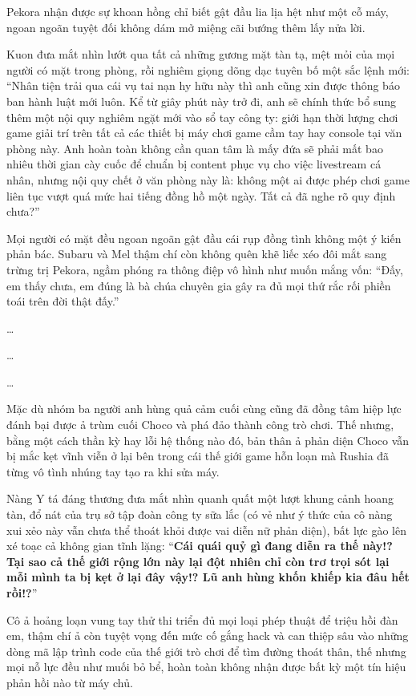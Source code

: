 \documentclass[../main.tex]{subfiles}
\begin{document}
Pekora nhận được sự khoan hồng chỉ biết gật đầu lia lịa hệt như một cỗ máy, ngoan ngoãn tuyệt đối không dám mở miệng cãi bướng thêm lấy nửa lời.

Kuon đưa mắt nhìn lướt qua tất cả những gương mặt tàn tạ, mệt mỏi của mọi người có mặt trong phòng, rồi nghiêm giọng dõng dạc tuyên bố một sắc lệnh mới: ``Nhân tiện trải qua cái vụ tai nạn hy hữu này thì anh cũng xin được thông báo ban hành luật mới luôn. Kể từ giây phút này trở đi, anh sẽ chính thức bổ sung thêm một nội quy nghiêm ngặt mới vào sổ tay công ty: giới hạn thời lượng chơi game giải trí trên tất cả các thiết bị máy chơi game cầm tay hay console tại văn phòng này. Anh hoàn toàn không cần quan tâm là mấy đứa sẽ phải mất bao nhiêu thời gian cày cuốc để chuẩn bị content phục vụ cho việc livestream cá nhân, nhưng nội quy chết ở văn phòng này là: không một ai được phép chơi game liên tục vượt quá mức hai tiếng đồng hồ một ngày. Tất cả đã nghe rõ quy định chưa?''

Mọi người có mặt đều ngoan ngoãn gật đầu cái rụp đồng tình không một ý kiến phản bác. Subaru và Mel thậm chí còn không quên khẽ liếc xéo đôi mắt sang trừng trị Pekora, ngầm phóng ra thông điệp vô hình như muốn mắng vốn: ``Đấy, em thấy chưa, em đúng là bà chúa chuyên gia gây ra đủ mọi thứ rắc rối phiền toái trên đời thật đấy.''

\dots

\dots

\dots

Mặc dù nhóm ba người anh hùng quả cảm cuối cùng cũng đã đồng tâm hiệp lực đánh bại được ả trùm cuối Choco và phá đảo thành công trò chơi. Thế nhưng, bằng một cách thần kỳ hay lỗi hệ thống nào đó, bản thân ả phản diện Choco vẫn bị mắc kẹt vĩnh viễn ở lại bên trong cái thế giới game hỗn loạn mà Rushia đã từng vô tình nhúng tay tạo ra khi sửa máy.

Nàng Y tá đáng thương đưa mắt nhìn quanh quất một lượt khung cảnh hoang tàn, đổ nát của trụ sở tập đoàn công ty sữa lắc (có vẻ như ý thức của cô nàng xui xẻo này vẫn chưa thể thoát khỏi được vai diễn nữ phản diện), bất lực gào lên xé toạc cả không gian tĩnh lặng: ``\textbf{Cái quái quỷ gì đang diễn ra thế này!? Tại sao cả thế giới rộng lớn này lại đột nhiên chỉ còn trơ trọi sót lại mỗi mình ta bị kẹt ở lại đây vậy!? Lũ anh hùng khốn khiếp kia đâu hết rồi!?}''

Cô ả hoảng loạn vung tay thử thi triển đủ mọi loại phép thuật để triệu hồi đàn em, thậm chí ả còn tuyệt vọng đến mức cố gắng hack và can thiệp sâu vào những dòng mã lập trình code của thế giới trò chơi để tìm đường thoát thân, thế nhưng mọi nỗ lực đều như muối bỏ bể, hoàn toàn không nhận được bất kỳ một tín hiệu phản hồi nào từ máy chủ.
\end{document}
